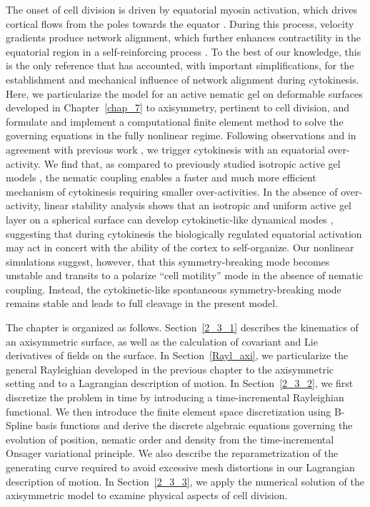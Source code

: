The onset of cell division is driven by equatorial myosin activation, which drives cortical flows from the poles towards the equator \cite{spira2017}. During this process, velocity gradients produce network alignment, which further enhances contractility in the equatorial region in a self-reinforcing process \cite{anne2016}. To the best of our knowledge, this is the only reference that has accounted, with important simplifications, for the establishment and mechanical influence of network alignment during cytokinesis. Here, we particularize the model for an active nematic  gel on deformable surfaces developed in Chapter~\ref{chap_7} to axisymmetry, pertinent to cell division, and formulate and implement a computational finite element method to solve the governing equations in the fully nonlinear regime. Following observations \cite{spira2017} and in agreement with previous work \cite{turlier2014}, we trigger cytokinesis with an equatorial over-activity. We find that, as compared to previously studied isotropic active gel models \cite{turlier2014},  the nematic coupling enables a faster and much more efficient mechanism of cytokinesis requiring smaller over-activities. In the absence of over-activity, linear stability analysis shows that an isotropic and uniform active gel layer on a spherical surface can develop cytokinetic-like dynamical modes \cite{mietke2019_2}, suggesting that during cytokinesis the biologically regulated equatorial activation may act in concert with the ability of the cortex to self-organize. Our nonlinear simulations suggest, however, that this symmetry-breaking mode becomes unstable and transits to a polarize ``cell motility'' mode in the absence of nematic coupling. Instead, the cytokinetic-like spontaneous symmetry-breaking mode remains stable and leads to full cleavage in the present model. 
 
 The chapter is organized as follows. Section~\ref{2_3_1} describes the kinematics of an axisymmetric surface, as well as the calculation of covariant and Lie derivatives of fields on the surface. In Section~\ref{Rayl_axi}, we particularize the general Rayleighian developed in the previous chapter to the axisymmetric setting and to a Lagrangian description of motion. In Section~\ref{2_3_2}, we first discretize the problem in time by introducing a time-incremental Rayleighian functional. We then introduce the finite element space discretization using B-Spline basis functions and derive the discrete algebraic equations governing the evolution of position, nematic order and density from the time-incremental Onsager variational principle. We also describe the reparametrization of the generating curve required to avoid excessive mesh distortions in our Lagrangian description of motion.  In Section~\ref{2_3_3}, we apply the numerical solution of the axisymmetric model to examine physical aspects of cell division.

